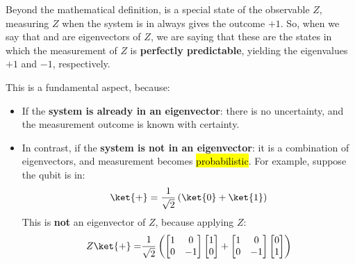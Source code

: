 \begin{enumerate}
\begin{remarkbox}
        Beyond the mathematical definition,  is a special state of the observable $Z$, measuring $Z$ when the system is in  always gives the outcome $+1$. So, when we say that  and  are eigenvectors of $Z$, we are saying that these are the states in which the measurement of $Z$ is \textbf{perfectly predictable}, yielding the eigenvalues $+1$ and $-1$, respectively.
        
        \newpage

        This is a fundamental aspect, because:
        \begin{itemize}
            \item[\textcolor{Green3}{\faIcon{check}}] If the \textbf{system is already in an eigenvector}: there is no uncertainty, and the measurement outcome is known with certainty.
            \item[\textcolor{Red3}{\faIcon{balance-scale}}] In contrast, if the \textbf{system is not in an eigenvector}: it is a combination of eigenvectors, and measurement becomes \hl{probabilistic}. For example, suppose the qubit is in:
            \begin{equation*}
                \ket{+} = \frac{1}{\sqrt{2}}\left(\ket{0} + \ket{1}\right)
            \end{equation*}
            This is \textbf{not} an eigenvector of $Z$, because applying $Z$:
            \begin{align*}
                Z\ket{+} =&
                \frac{1}{\sqrt{2}}\left(
                    \begin{bmatrix}
                        1 & 0 \\
                        0 & -1
                    \end{bmatrix}
                    \begin{bmatrix}
                        1 \\
                        0
                    \end{bmatrix}
                    +
                    \begin{bmatrix}
                        1 & 0 \\
                        0 & -1
                    \end{bmatrix}
                    \begin{bmatrix}
                        0 \\
                        1
                    \end{bmatrix}
                \right) \\

\end{align*}
\end{itemize}
\end{remarkbox}
\end{enumerate}
